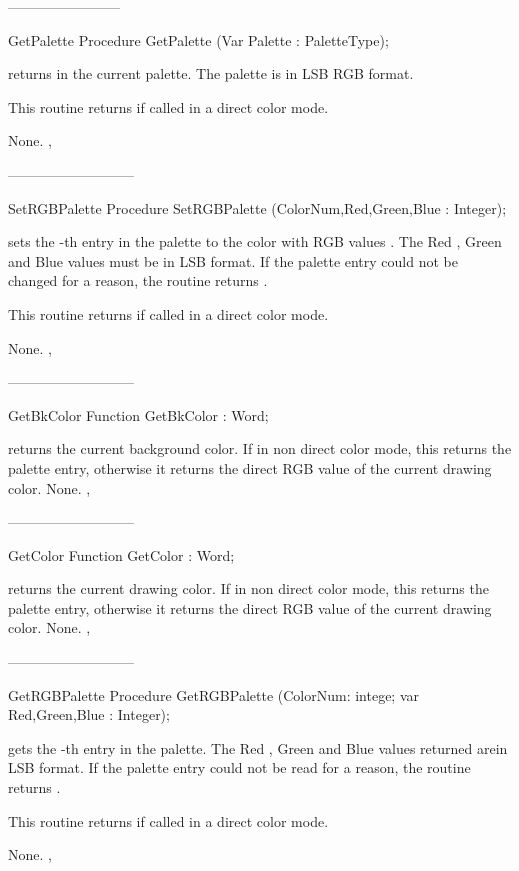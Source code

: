 ------------------------
\begin{procedure}{GetPalette}
\Declaration
Procedure GetPalette (Var Palette : PaletteType);

\Description
{} returns in  the current palette. The palette
is in LSB RGB format.

This routine returns  if called in a direct color mode.

\Errors
None.
\SeeAlso
{}, 
\end{procedure}
---------------------------
\begin{procedure}{SetRGBPalette}
\Declaration
Procedure SetRGBPalette (ColorNum,Red,Green,Blue : Integer);

\Description
{} sets the -th entry in the palette to the
color with RGB values . The Red , Green and Blue values
must be in LSB format. If the palette entry could not be changed for a
reason, the routine returns .

This routine returns  if called in a direct color mode.

\Errors
None.
\SeeAlso
{},
\end{procedure}
---------------------------
\begin{function}{GetBkColor}
\Declaration
Function GetBkColor  : Word;

\Description
{} returns the current background color. If in non direct color
mode, this returns the palette entry, otherwise it returns the direct
RGB value of the current drawing color.
\Errors
None.
\SeeAlso
{},
\end{function}
---------------------------
\begin{function}{GetColor}
\Declaration
Function GetColor  : Word;

\Description
{} returns the current drawing color. If in non direct color
mode, this returns the palette entry, otherwise it returns the direct
RGB value of the current drawing color.
\Errors
None.
\SeeAlso
{},
\end{function}
---------------------------
\begin{procedure}{GetRGBPalette}
\Declaration
Procedure GetRGBPalette (ColorNum: intege; var Red,Green,Blue : Integer);

\Description
{} gets the -th entry in the palette.
The Red , Green and Blue values returned arein LSB format.
If the palette entry could not be read for a reason,
the routine returns .

This routine returns  if called in a direct color mode.

\Errors
None.
\SeeAlso
{},
\end{procedure}

